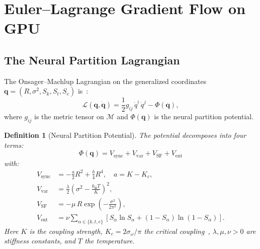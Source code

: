 \documentclass[11pt,twocolumn,a4paper]{article}
\newtheorem{definition}[theorem]{Definition}
\newcommand{\kb}{k_{\mathrm{B}}}
\newcommand{\Sk}{S_k}
\newcommand{\St}{S_t}
\newcommand{\Se}{S_e}
\newcommand{\Lag}{\mathcal{L}}
\newcommand{\Pot}{\Phi}
\newcommand{\qvec}{\mathbf{q}}
\begin{document}

\section{Euler--Lagrange Gradient Flow on GPU}
\label{sec:euler-lagrange}

\subsection{The Neural Partition Lagrangian}

The Onsager--Machlup Lagrangian on the generalized coordinates $\qvec = (R, \sigma^2, \Sk, \St, \Se)$ is~\cite{sachikonye2026lagrangian,onsager1953,machlup1953}:
\begin{equation}
\Lag(\qvec, \dot{\qvec}) = \frac{1}{2} g_{ij}\,\dot{q}^i\,\dot{q}^j - \Pot(\qvec),
\label{eq:lagrangian}
\end{equation}
where $g_{ij}$ is the metric tensor on $\mathcal{M}$ and $\Pot(\qvec)$ is the neural partition potential.

\begin{definition}[Neural Partition Potential]
\label{def:potential}
The potential decomposes into four terms:
\begin{equation}
\boxed{\Pot(\qvec) = V_{\mathrm{sync}} + V_{\mathrm{var}} + V_{\mathrm{SF}} + V_{\mathrm{ent}}}
\label{eq:potential}
\end{equation}
with:
\begin{align}
V_{\mathrm{sync}} &= -\frac{a}{2}R^2 + \frac{b}{4}R^4, \quad a = K - K_c, \label{eq:vsync} \\
V_{\mathrm{var}} &= \frac{\lambda}{2}\!\left(\sigma^2 - \frac{\kb T}{K}\right)^{\!2}, \label{eq:vvar} \\
V_{\mathrm{SF}} &= -\mu\,R\exp\!\left(-\frac{\sigma^2}{2\pi^2}\right), \label{eq:vsf} \\
V_{\mathrm{ent}} &= \nu \sum_{\alpha \in \{k,t,e\}} \left[S_\alpha \ln S_\alpha + (1-S_\alpha)\ln(1-S_\alpha)\right]. \label{eq:vent}
\end{align}
Here $K$ is the coupling strength, $K_c = 2\sigma_\omega/\pi$ the critical coupling~\cite{kuramoto1975}, $\lambda, \mu, \nu > 0$ are stiffness constants, and $T$ the temperature.
\end{definition}
\end{document}
